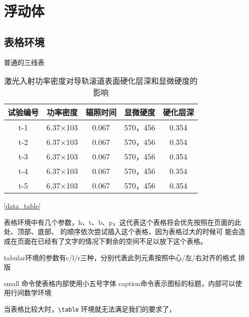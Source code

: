 \documentclass[../../main.tex]{subfiles}
\begin{document}
\section{浮动体}

\subsection{表格环境}

普通的三线表

\begin{table}[htbp]
        \newcommand{\tabincell}[2]{\begin{tabular}{@{}#1@{}}#2\end{tabular}}
        \centering
        \caption{激光入射功率密度对导轨滚道表面硬化层深和显微硬度的影响}
        \begin{tabular}{ccccc}
                \toprule    %
                试验编号 & 功率密度 & 辐照时间 & 显微硬度       & 硬化层深\\ 
                \midrule    %
                t-1	&6.37×103	&0.067	&570，456	&0.354\\
                t-2	&6.37×103	&0.067	&570，456	&0.354\\
                t-3	&6.37×103	&0.067	&570，456	&0.354\\
                t-4	&6.37×103	&0.067	&570，456	&0.354\\
                t-5	&6.37×103	&0.067	&570，456	&0.354\\ 
          \bottomrule   %
        \end{tabular}
        \label{data_table}
\end{table}


\autoref{data_table}

表格环境中有几个参数，h、t、b、p，这代表这个表格将会优先按照在页面的此
处、顶部、底部、 的顺序依次尝试插入这个表格，因为表格过大的时候可
能会造成在页面在已经有了文字的情况下剩余的空间不足以放下这个表格。


tabular环境的参数有c/l/r三种，分别代表此列元素按照中心/左/右对齐的格式
排版

small 命令使表格内部使用小五号字体
caption命令表示图标的标题，内部可以使用行间数学环境



当表格比较大时，\verb|\table|
环境就无法满足我们的要求了，
\end{document}

